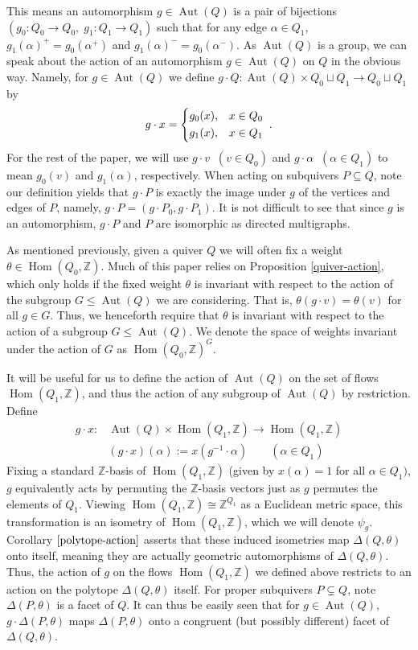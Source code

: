 \documentclass[12pt]{amsart}
\theoremstyle{plain}
\theoremstyle{definition}
\newcommand{\Z}{\mathbb{Z}}
\DeclareMathOperator{\aut}{Aut}
\DeclareMathOperator{\Hom}{Hom}
\renewcommand{\hom}{\Hom}
\begin{document}
This means an automorphism $g \in \aut(Q)$ is a pair of bijections $(g_0 : Q_0 \to Q_0, \;g_1 : Q_1 \to Q_1)$ such that for any edge $\alpha \in Q_1$, $g_1(\alpha)^+ = g_0(\alpha^+)$ and $g_1(\alpha)^- = g_0(\alpha^-)$. As $\aut(Q)$ is a group, we can speak about the action of an automorphism $g \in \aut(Q)$ on $Q$ in the obvious way. Namely, for $g \in \aut(Q)$ we define $g \cdot Q : \aut(Q) \times Q_0 \sqcup Q_1 \longrightarrow Q_0 \sqcup Q_1$ by 
\[
g \cdot x = \begin{dcases}
    g_0(x), &x \in Q_0 \\
    g_1(x), &x \in Q_1
\end{dcases}\;.
\]
For the rest of the paper, we will use $g \cdot v \;\;(v \in Q_0)$ and $g \cdot \alpha \;\; (\alpha \in Q_1)$ to mean $g_0(v)$ and $g_1(\alpha)$, respectively. When acting on subquivers $P \subseteq Q$, note our definition yields that $g \cdot P$ is exactly the image under $g$ of the vertices and edges of $P$, namely, $g \cdot P = (g \cdot P_0, g \cdot P_1)$. It is not difficult to see that since $g$ is an automorphism, $g \cdot P$ and $P$ are isomorphic as directed multigraphs.

As mentioned previously, given a quiver $Q$ we will often fix a weight $\theta \in \hom(Q_0, \Z)$. Much of this paper relies on Proposition \ref{quiver-action}, which only holds if the fixed weight $\theta$ is invariant with respect to the action of the subgroup $G \leq \aut(Q)$ we are considering. That is, $\theta(g \cdot v) = \theta(v)$ for all $g \in G$. Thus, we henceforth require that $\theta$ is invariant with respect to the action of a subgroup $G \leq \aut(Q)$. We denote the space of weights invariant under the action of $G$ as $\hom(Q_0, \Z)^G$. 

It will be useful for us to define the action of $\aut(Q)$ on the set of flows $\hom(Q_1, \Z)$, and thus the action of any subgroup of $\aut(Q)$ by restriction. Define 
\begin{align*}
g \cdot x :& \aut(Q) \times \hom(Q_1, \Z)\longrightarrow \hom(Q_1, \Z) \\
&(g \cdot x)(\alpha) := x(g^{-1} \cdot \alpha) \qquad (\alpha \in Q_1)
\end{align*}
Fixing a standard $\Z$-basis of $\hom(Q_1, \Z)$ (given by $x(\alpha) = 1$ for all $\alpha \in Q_1)$, $g$ equivalently acts by permuting the $\Z$-basis vectors just as $g$ permutes the elements of $Q_1$. Viewing $\hom(Q_1, \Z) \cong \Z^{Q_1}$ as a Euclidean metric space, this transformation is an isometry of $\hom(Q_1, \Z)$, which we will denote $\psi_g$. Corollary $\ref{polytope-action}$ asserts that these induced isometries map $\Delta(Q, \theta)$ onto itself, meaning they are actually geometric automorphisms of $\Delta(Q, \theta)$. Thus, the action of $g$ on the flows $\hom(Q_1, \Z)$ we defined above restricts to an action on the polytope $\Delta(Q, \theta)$ itself. For proper subquivers $P \subsetneq Q$, note $\Delta(P, \theta)$ is a facet of $Q$. It can thus be easily seen that for $g \in \aut(Q)$, $g \cdot\Delta(P, \theta)$ maps $\Delta(P, \theta)$ onto a congruent (but possibly different) facet of $\Delta(Q, \theta)$.
\end{document}
